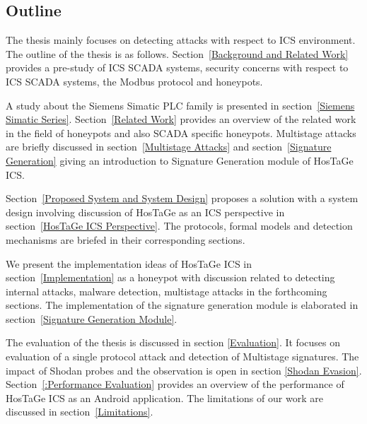 \documentclass[article,msc=informatik,type=msc,colorback,accentcolor=tud9c]{tudthesis}
\begin{document}
    
    \vspace{5mm} 
   
   \subsection{Outline}\label{Outline}
      
   The thesis mainly focuses on detecting attacks with respect to \ac{ICS} environment. The outline of the thesis is as follows. Section~\ref{Background and Related Work} provides a pre-study of \ac{ICS} \ac{SCADA} systems, security concerns with respect to \ac{ICS} \ac{SCADA} systems, the Modbus protocol  and honeypots. 
   
   \vspace{3mm}
    A study about the Siemens Simatic \ac{PLC} family is presented in  section~\ref{Siemens Simatic Series}.
    Section~\ref{Related Work} provides an overview of the related work in the field of honeypots and also \ac{SCADA} specific honeypots. Multistage attacks are briefly discussed in section~\ref{Multistage Attacks} and section~\ref{Signature Generation} giving an introduction to Signature Generation module of HosTaGe ICS.
   
   
   \vspace{3mm}
   Section~\ref{Proposed System and System Design} proposes a solution with a system design involving discussion of HosTaGe as an \ac{ICS} perspective in section~\ref{HosTaGe ICS Perspective}.  The protocols, formal models  and detection mechanisms are briefed in their corresponding sections.
   
   
   \vspace{3mm}
   We present the implementation ideas of HosTaGe ICS in section~\ref{Implementation} as a honeypot with discussion related to detecting internal attacks, malware detection, multistage attacks in the forthcoming sections. The implementation of the signature generation module is elaborated in section~\ref{Signature Generation Module}. 
   
   
   \vspace{3mm}
   The evaluation of the thesis is discussed in section \ref{Evaluation}. It focuses on evaluation of a single protocol attack and detection of Multistage signatures. The impact of Shodan probes and the observation is open in section \ref{Shodan Evasion}.   
   Section~\ref{:Performance Evaluation} provides an overview of the performance of HosTaGe ICS as an Android application. The limitations of our work  are discussed in section~\ref{Limitations}.
   
\end{document}
